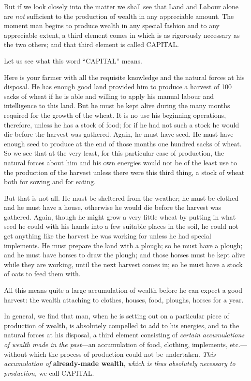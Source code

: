 \documentclass{book}
\begin{document}
But if we look closely into the matter we shall see that Land and Labour alone are \emph{not} sufficient to the production of wealth in any appreciable amount. The moment man begins to produce wealth in any special fashion and to any appreciable extent, a third element comes in which is as rigorously necessary as the two others; and that third element is called CAPITAL.

Let us see what this word “CAPITAL” means.

Here is your farmer with all the requisite knowledge and the natural forces at his disposal. He has enough good land provided him to produce a harvest of 100 sacks of wheat if he is able and willing to apply his manual labour and intelligence to this land. But he must be kept alive during the many months required for the growth of the wheat. It is no use his beginning operations, therefore, unless he has a stock of food; for if he had not such a stock he would die before the harvest was gathered. Again, he must have seed. He must have enough seed to produce at the end of those months one hundred sacks of wheat. So we see that at the very least, for this particular case of production, the natural forces about him and his own energies would not be of the least use to the production of the harvest unless there were this third thing, a stock of wheat both for sowing and for eating.

But that is not all. He must be sheltered from the weather; he must be clothed and he must have a house, otherwise he would die before the harvest was gathered. Again, though he might grow a very little wheat by putting in what seed he could with his hands into a few suitable places in the soil, he could not get anything like the harvest he was working for unless he had special implements. He must prepare the land with a plough; so he must have a plough; and he must have horses to draw the plough; and those horses must be kept alive while they are working, until the next harvest comes in; so he must have a stock of oats to feed them with.

All this means quite a large accumulation of wealth before he can expect a good harvest: the wealth attaching to clothes, houses, food, ploughs, horses for a year.

In general, we find that man, when he is setting out on a particular piece of production of wealth, is absolutely compelled to add to his energies, and to the natural forces at his disposal, a third element consisting of \emph{certain accumulations of wealth made in the past}—an accumulation of food, clothing, implements, etc.—without which the process of production could not be undertaken. \emph{This accumulation of} \textbf{already-made wealth}, \emph{which is thus absolutely necessary to production,} we call CAPITAL.
\end{document}
